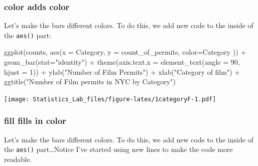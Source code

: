\documentclass[
]{book}
\newenvironment{Shaded}{\begin{snugshade}}{\end{snugshade}}
\newcommand{\AttributeTok}[1]{\textcolor[rgb]{0.77,0.63,0.00}{#1}}
\newcommand{\DecValTok}[1]{\textcolor[rgb]{0.00,0.00,0.81}{#1}}
\newcommand{\FunctionTok}[1]{\textcolor[rgb]{0.00,0.00,0.00}{#1}}
\newcommand{\NormalTok}[1]{#1}
\newcommand{\SpecialCharTok}[1]{\textcolor[rgb]{0.00,0.00,0.00}{#1}}
\newcommand{\StringTok}[1]{\textcolor[rgb]{0.31,0.60,0.02}{#1}}
\begin{document}
\hypertarget{color-adds-color}{%
\subsubsection{color adds color}\label{color-adds-color}}

Let's make the bars different colors. To do this, we add new code to the inside of the \texttt{aes()} part:

\begin{Shaded}
\begin{Highlighting}[]
\FunctionTok{ggplot}\NormalTok{(counts, }\FunctionTok{aes}\NormalTok{(}\AttributeTok{x =}\NormalTok{ Category, }\AttributeTok{y =}\NormalTok{ count\_of\_permits, }\AttributeTok{color=}\NormalTok{Category )) }\SpecialCharTok{+}
  \FunctionTok{geom\_bar}\NormalTok{(}\AttributeTok{stat=}\StringTok{"identity"}\NormalTok{) }\SpecialCharTok{+} 
  \FunctionTok{theme}\NormalTok{(}\AttributeTok{axis.text.x =} \FunctionTok{element\_text}\NormalTok{(}\AttributeTok{angle =} \DecValTok{90}\NormalTok{, }\AttributeTok{hjust =} \DecValTok{1}\NormalTok{)) }\SpecialCharTok{+}
  \FunctionTok{ylab}\NormalTok{(}\StringTok{"Number of Film Permits"}\NormalTok{) }\SpecialCharTok{+} 
  \FunctionTok{xlab}\NormalTok{(}\StringTok{"Category of film"}\NormalTok{) }\SpecialCharTok{+}
  \FunctionTok{ggtitle}\NormalTok{(}\StringTok{"Number of Film permits in NYC by Category"}\NormalTok{)}
\end{Highlighting}
\end{Shaded}

\texttt{[image: Statistics\_Lab\_files/figure-latex/1categoryF-1.pdf]}

\hypertarget{fill-fills-in-color}{%
\subsubsection{fill fills in color}\label{fill-fills-in-color}}

Let's make the bars different colors. To do this, we add new code to the inside of the \texttt{aes()} part\ldots Notice I've started using new lines to make the code more readable.
\end{document}
